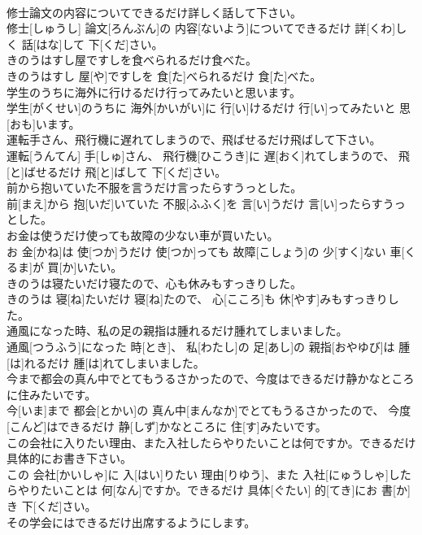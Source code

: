 \documentclass[8pt]{extreport}
\begin{document}
\begin{CJK}{UTF8}{min}
\\	修士論文の内容についてできるだけ詳しく話して下さい。	
\\	修士[しゅうし] 論文[ろんぶん]の 内容[ないよう]についてできるだけ 詳[くわ]しく 話[はな]して 下[くだ]さい。
\\	きのうはすし屋ですしを食べられるだけ食べた。	
\\	きのうはすし 屋[や]ですしを 食[た]べられるだけ 食[た]べた。
\\	学生のうちに海外に行けるだけ行ってみたいと思います。	
\\	学生[がくせい]のうちに 海外[かいがい]に 行[い]けるだけ 行[い]ってみたいと 思[おも]います。
\\	運転手さん、飛行機に遅れてしまうので、飛ばせるだけ飛ばして下さい。	
\\	運転[うんてん] 手[しゅ]さん、 飛行機[ひこうき]に 遅[おく]れてしまうので、 飛[と]ばせるだけ 飛[と]ばして 下[くだ]さい。
\\	前から抱いていた不服を言うだけ言ったらすうっとした。	
\\	前[まえ]から 抱[いだ]いていた 不服[ふふく]を 言[い]うだけ 言[い]ったらすうっとした。
\\	お金は使うだけ使っても故障の少ない車が買いたい。	
\\	お 金[かね]は 使[つか]うだけ 使[つか]っても 故障[こしょう]の 少[すく]ない 車[くるま]が 買[か]いたい。
\\	きのうは寝たいだけ寝たので、心も休みもすっきりした。	
\\	きのうは 寝[ね]たいだけ 寝[ね]たので、 心[こころ]も 休[やす]みもすっきりした。
\\	通風になった時、私の足の親指は腫れるだけ腫れてしまいました。	
\\	通風[つうふう]になった 時[とき]、 私[わたし]の 足[あし]の 親指[おやゆび]は 腫[は]れるだけ 腫[は]れてしまいました。
\\	今まで都会の真ん中でとてもうるさかったので、今度はできるだけ静かなところに住みたいです。	
\\	今[いま]まで 都会[とかい]の 真ん中[まんなか]でとてもうるさかったので、 今度[こんど]はできるだけ 静[しず]かなところに 住[す]みたいです。
\\	この会社に入りたい理由、また入社したらやりたいことは何ですか。できるだけ具体的にお書き下さい。	
\\	この 会社[かいしゃ]に 入[はい]りたい 理由[りゆう]、また 入社[にゅうしゃ]したらやりたいことは 何[なん]ですか。できるだけ 具体[ぐたい] 的[てき]にお 書[か]き 下[くだ]さい。
\\	その学会にはできるだけ出席するようにします。	

\end{CJK}
\end{document}
